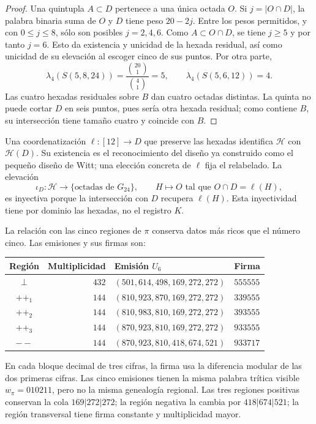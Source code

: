 \begin{proof}
Una quintupla $A\subset D$ pertenece a una única octada $O$. Si
$j=|O\cap D|$, la palabra binaria suma de $O$ y $D$ tiene peso
$20-2j$. Entre los pesos permitidos, y con $0\leq j\leq8$, sólo
son posibles $j=2,4,6$. Como $A\subset O\cap D$, se tiene $j\geq5$
y por tanto $j=6$. Esto da existencia y unicidad de la hexada
residual, así como unicidad de su elevación al escoger cinco de sus
puntos. Por otra parte,
\[
 \lambda_4(S(5,8,24))=\frac{\binom{20}1}{\binom41}=5,
 \qquad
 \lambda_4(S(5,6,12))=4.
\]
Las cuatro hexadas residuales sobre $B$ dan cuatro octadas distintas.
La quinta no puede cortar $D$ en seis puntos, pues sería otra hexada
residual; como contiene $B$, su intersección tiene tamaño cuatro y
coincide con $B$.
\end{proof}

Una coordenatización $\ell:[12]\to D$ que preserve las hexadas identifica
$\mathcal H$ con $\mathcal H(D)$. Su existencia es el reconocimiento
del diseño ya construido como el pequeño diseño de Witt; una elección
concreta de $\ell$ fija el relabelado. La elevación
\[
 \iota_D:\mathcal H\longrightarrow
       \{\text{octadas de }G_{24}\},
 \qquad H\longmapsto O\text{ tal que }O\cap D=\ell(H),
\]
es inyectiva porque la intersección con $D$ recupera $\ell(H)$.
Esta inyectividad tiene por dominio las hexadas, no el registro $K$.

La relación con las cinco regiones de $\pi$ conserva datos más ricos
que el número cinco. Las emisiones y sus firmas son:
\begin{center}
\small
\begin{tabular}{@{}crll@{}}
\toprule
Región & Multiplicidad & Emisión $U_6$ & Firma \\
\midrule
$\perp$ & $432$ & $(501,614,498,169,272,272)$ & $555555$ \\
$++_1$ & $144$ & $(810,923,870,169,272,272)$ & $339555$ \\
$++_2$ & $144$ & $(810,983,810,169,272,272)$ & $393555$ \\
$++_3$ & $144$ & $(870,923,810,169,272,272)$ & $933555$ \\
$--$ & $144$ & $(870,923,810,418,674,521)$ & $933717$ \\
\bottomrule
\end{tabular}
\end{center}
En cada bloque decimal de tres cifras, la firma usa la diferencia
modular de las dos primeras cifras. Las cinco emisiones tienen la
misma palabra trítica visible $w_\pi=010211$, pero no la misma
genealogía regional. Las tres regiones positivas conservan la cola
$169|272|272$; la región negativa la cambia por $418|674|521$;
la región transversal tiene firma constante y multiplicidad mayor.

